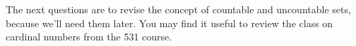 \documentclass{article}
\theoremstyle{definition}
\begin{document}
\begin{comment}
\item (Step 4) Move the tape heads $h_i$ such that $i$ is divisible by $2,3,5,7$ to the right. Keep the others in place except $h_5$ which moves back to square 1, and also move $h_7$ back to the start of the tape.
\item (Step $k$) To understand the pattern here we list the prime numbers (in order) as $p_1,p_2,\ldots$. At the start of computation step $k>2$, the tape heads with numbers divisible by $p_1\times\ldots \times p_{k-1}$ are reading cell $k-1$. The head $h_{p_{k-1}}$ is also back at the start of the tape reading the $:$ symbol. The fact that $h_{p_{k-1}}$ is reading $:$ is very important, as using this we can code the machine so that it advances all tape heads with numbers divisible by $p_1\times\ldots \times p_{k}$ to the right, and also send head $h_{p_k}$ back ready for the next round.
\item At some point there will be an infinite number of tape heads reading the blank space symbol. This tells the machine the end of the input has been reached.
\item When the end has been reached, we have an infinite set of tape heads reading the first symbol of the input, another infinite set reading the 2nd symbol, and so on. Moreover, these infinite sets are distinguishable by the numbers of the heads they contain (e.g. the first contains odd numbered heads, the second contains those divisible by 2, but not by any other prime, and so on). We write the transition function so that if the string being read is in $L$ the machine accepts, and it rejects otherwise.
\end{itemize}
\end{comment}

The next questions are to revise the concept of countable and uncountable sets, because we'll need them later. You may find it useful to review the class on cardinal numbers from the 531 course.
\end{document}
